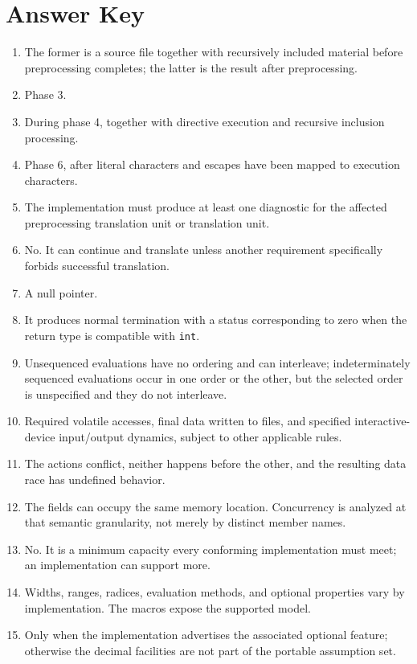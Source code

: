 \documentclass[10pt,letterpaper]{article}
\begin{document}
\section{Answer Key}
\begin{enumerate}
  \item The former is a source file together with recursively included material before preprocessing completes; the latter is the result after preprocessing.

  \item Phase 3.

  \item During phase 4, together with directive execution and recursive inclusion processing.

  \item Phase 6, after literal characters and escapes have been mapped to execution characters.

  \item The implementation must produce at least one diagnostic for the affected preprocessing translation unit or translation unit.

  \item No. It can continue and translate unless another requirement specifically forbids successful translation.

  \item A null pointer.

  \item It produces normal termination with a status corresponding to zero when the return type is compatible with \texttt{int}.

  \item Unsequenced evaluations have no ordering and can interleave; indeterminately sequenced evaluations occur in one order or the other, but the selected order is unspecified and they do not interleave.

  \item Required volatile accesses, final data written to files, and specified interactive-device input/output dynamics, subject to other applicable rules.

  \item The actions conflict, neither happens before the other, and the resulting data race has undefined behavior.

  \item The fields can occupy the same memory location. Concurrency is analyzed at that semantic granularity, not merely by distinct member names.

  \item No. It is a minimum capacity every conforming implementation must meet; an implementation can support more.

  \item Widths, ranges, radices, evaluation methods, and optional properties vary by implementation. The macros expose the supported model.

  \item Only when the implementation advertises the associated optional feature; otherwise the decimal facilities are not part of the portable assumption set.
\end{enumerate}
\end{document}
